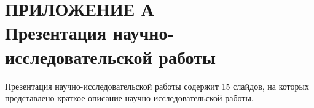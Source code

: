 \chapter*{ПРИЛОЖЕНИЕ А\\Презентация научно-исследовательской работы}
Презентация научно-исследовательской работы содержит 15 слайдов, на которых представлено краткое описание научно-исследовательской работы.
